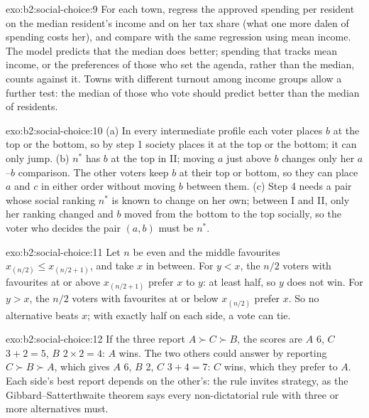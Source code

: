 \begin{solution}{exo:b2:social-choice:9}
For each town, regress the approved spending per resident on the median resident's income and on her tax share
(what one more dalen of spending costs her), and compare with the same regression using mean income. The
model predicts that the median does better; spending that tracks mean income, or the preferences of
those who set the agenda, rather than the median, counts against it. Towns with different turnout among
income groups allow a further test: the median of those who vote should predict better than the median of
residents.
\end{solution}

\begin{solution}{exo:b2:social-choice:10}
(a) In every intermediate profile each voter places $b$ at the top or the bottom, so by step 1 society places it at
the top or the bottom; it can only jump. (b) $n^*$ has $b$ at the top in II; moving $a$ just above $b$ changes only
her $a$--$b$ comparison. The other voters keep $b$ at their top or bottom, so they can place $a$ and $c$ in either
order without moving $b$ between them. (c) Step 4 needs a pair whose social ranking $n^*$ is known to change on
her own; between I and II, only her ranking changed and $b$ moved from the bottom to the top socially, so the
voter who decides the pair $(a, b)$ must be $n^*$.
\end{solution}

\begin{solution}{exo:b2:social-choice:11}
Let $n$ be even and the middle favourites $x_{(n/2)} \le x_{(n/2+1)}$, and take $x$ in between. For $y < x$, the $n/2$
voters with favourites at or above $x_{(n/2+1)}$ prefer $x$ to $y$: at least half, so $y$ does not win. For $y > x$, the
$n/2$ voters with favourites at or below $x_{(n/2)}$ prefer $x$. So no alternative beats $x$; with exactly half on each
side, a vote can tie.
\end{solution}

\begin{solution}{exo:b2:social-choice:12}
If the three report $A \succ C \succ B$, the scores are $A$ 6, $C$ $3 + 2 = 5$, $B$ $2 \times 2 = 4$: $A$ wins. The two others
could answer by reporting $C \succ B \succ A$, which gives $A$ 6, $B$ 2, $C$ $3 + 4 = 7$: $C$ wins, which they prefer to
$A$. Each side's best report depends on the other's: the rule invites strategy, as the Gibbard--Satterthwaite
theorem says every non-dictatorial rule with three or more alternatives must.
\end{solution}

